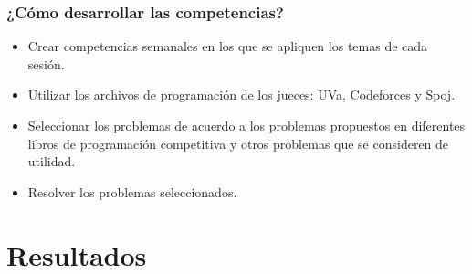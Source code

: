 \documentclass{beamer}
\begin{document}
	\begin{frame}
		\frametitle{¿Cómo desarrollar las competencias?}
		\begin{itemize}
			\item Crear competencias semanales en los que se apliquen los temas de cada sesión.
			\item Utilizar los archivos de programación de los jueces: UVa, Codeforces y Spoj.
			\item Seleccionar los problemas de acuerdo a los problemas propuestos en diferentes libros de programación competitiva y otros problemas que se consideren de utilidad.
			\item Resolver los problemas seleccionados.
		\end{itemize}
		
	\end{frame}
	
\section{Resultados}
\end{document}

